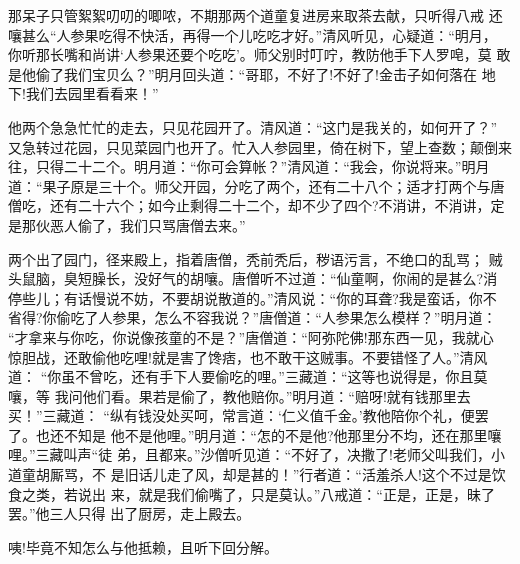 那呆子只管絮絮叨叨的唧哝，不期那两个道童复进房来取茶去献，只听得八戒
还嚷甚么“人参果吃得不快活，再得一个儿吃吃才好。”清风听见，心疑道：“明月，
你听那长嘴和尚讲‘人参果还要个吃吃’。师父别时叮咛，教防他手下人罗唣，莫
敢是他偷了我们宝贝么？”明月回头道：“哥耶，不好了!不好了!金击子如何落在
地下!我们去园里看看来！”

他两个急急忙忙的走去，只见花园开了。清风道：“这门是我关的，如何开了？”
又急转过花园，只见菜园门也开了。忙入人参园里，倚在树下，望上查数；颠倒来
往，只得二十二个。明月道：“你可会算帐？”清风道：“我会，你说将来。”明月
道：“果子原是三十个。师父开园，分吃了两个，还有二十八个；适才打两个与唐
僧吃，还有二十六个；如今止剩得二十二个，却不少了四个?不消讲，不消讲，定
是那伙恶人偷了，我们只骂唐僧去来。”

两个出了园门，径来殿上，指着唐僧，秃前秃后，秽语污言，不绝口的乱骂；
贼头鼠脑，臭短臊长，没好气的胡嚷。唐僧听不过道：“仙童啊，你闹的是甚么?消
停些儿；有话慢说不妨，不要胡说散道的。”清风说：“你的耳聋?我是蛮话，你不
省得?你偷吃了人参果，怎么不容我说？”唐僧道：“人参果怎么模样？”明月道：
“才拿来与你吃，你说像孩童的不是？”唐僧道：“阿弥陀佛!那东西一见，我就心
惊胆战，还敢偷他吃哩!就是害了馋痞，也不敢干这贼事。不要错怪了人。”清风道：
“你虽不曾吃，还有手下人要偷吃的哩。”三藏道：“这等也说得是，你且莫嚷，等
我问他们看。果若是偷了，教他赔你。”明月道：“赔呀!就有钱那里去买！”三藏道：
“纵有钱没处买呵，常言道：‘仁义值千金。’教他陪你个礼，便罢了。也还不知是
他不是他哩。”明月道：“怎的不是他?他那里分不均，还在那里嚷哩。”三藏叫声“徒
弟，且都来。”沙僧听见道：“不好了，决撒了!老师父叫我们，小道童胡厮骂，不
是旧话儿走了风，却是甚的！”行者道：“活羞杀人!这个不过是饮食之类，若说出
来，就是我们偷嘴了，只是莫认。”八戒道：“正是，正是，昧了罢。”他三人只得
出了厨房，走上殿去。

咦!毕竟不知怎么与他抵赖，且听下回分解。